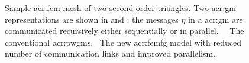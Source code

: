 \begin{figure}[t]
	\caption[Sample \acrshort{acr:femfg}.]{\protect{} Sample \gls{acr:fem} mesh of two second order triangles.  Two \gls{acr:gm} representations are shown in \protect{} and \protect{}; the messages $\eta$ in a \gls{acr:gm} are communicated recursively either sequentially or in parallel. ~\protect{}~The conventional \glspl{acr:pwgm}. \protect{}~The new \gls{acr:femfg} model with reduced number of communication links and improved parallelism.}
	\label{fig:FEM_GM}
\end{figure}



